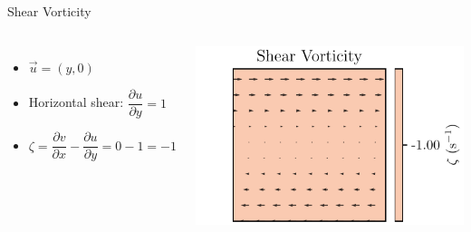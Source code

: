 \begin{frame}{Shear Vorticity}
	\begin{columns}
		\begin{itemize}
			\item \( \vec{u} = (y, 0) \)
			\item Horizontal shear: \( \dfrac{\partial u}{\partial y} = 1 \)
			\item \( \zeta = \dfrac{\partial v}{\partial x} - \dfrac{\partial u}{\partial y} = 0-1= -1 \)
		\end{itemize}

		\includegraphics[width=\linewidth]{../images/vorticity_plot1.pdf}
	\end{columns}
\end{frame}

